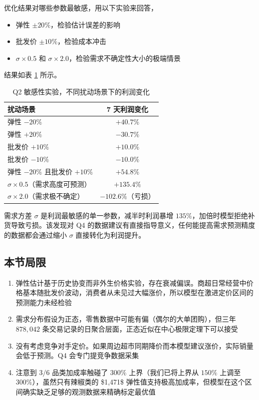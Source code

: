 优化结果对哪些参数最敏感，用以下实验来回答，

\begin{itemize}
\item 弹性 $\pm 20\%$，检验估计误差的影响
\item 批发价 $\pm 10\%$，检验成本冲击
\item $\sigma \times 0.5$ 和 $\sigma \times 2.0$，检验需求不确定性大小的极端情景
\end{itemize}

结果如表 \ref{tab:q2_robustness} 所示。

\begin{table}[H]
\centering
\caption{Q2 敏感性实验，不同扰动场景下的利润变化}
\label{tab:q2_robustness}
\begin{tabular}{lc}
\hline
扰动场景 & 7 天利润变化 \\
\hline
弹性 $-20\%$ & $+40.7\%$ \\
弹性 $+20\%$ & $-30.7\%$ \\
批发价 $+10\%$ & $+10.0\%$ \\
批发价 $-10\%$ & $-10.0\%$ \\
弹性 $-20\%$ 且批发价 $+10\%$ & $+54.8\%$ \\
$\sigma \times 0.5$（需求高度可预测） & $\mathbf{+135.4\%}$ \\
$\sigma \times 2.0$（需求极不确定） & $\mathbf{-102.6\%}$（亏损） \\
\hline
\end{tabular}
\end{table}

需求方差 $\sigma$ 是利润最敏感的单一参数，减半时利润暴增 $135\%$，加倍时模型拒绝补货导致亏损。该发现对 Q4 的数据建议有直接指导意义，任何能提高需求预测精度的数据都会通过缩小 $\sigma$ 直接转化为利润提升。

\subsection{本节局限}

\begin{enumerate}
\item 弹性估计基于历史协变而非外生价格实验，存在衰减偏误。商超日常经营中价格基本随批发价波动，消费者从未见过大幅涨价，所以模型在激进定价区间的预测能力未经检验
\item 需求分布假设为正态，零售数据中可能有偏（偶尔的大单团购），但三年 $878,042$ 条交易记录的日聚合层面，正态近似在中心极限定理下可以接受
\item 没有考虑竞争对手定价。如果周边超市同期降价而本模型建议涨价，实际销量会低于预测。Q4 会专门提竞争数据采集
\item 注意到 $3/6$ 品类加成率触碰了 $300\%$ 上界（我们已将上界从 $150\%$ 上调至 $300\%$），虽然只有辣椒类的 \$1,471\$ 弹性值支持极高加成率，但模型在这个区间确实缺乏足够的观测数据来精确标定最优值
\end{enumerate}
